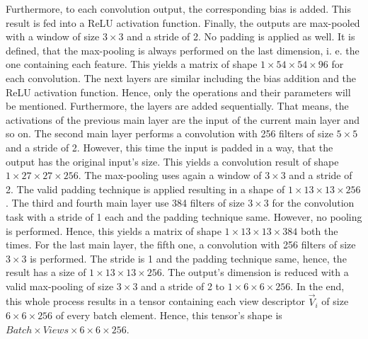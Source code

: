 Furthermore, to each convolution output, the corresponding bias is added.
This result is fed into a ReLU activation function.
Finally, the outputs are max-pooled with a window of size $3 \times 3$ and a stride of 2.
No padding is applied as well.
It is defined, that the max-pooling is always performed on the last dimension, i. e. the one containing each feature.
This yields a matrix of shape $1 \times 54 \times 54 \times 96$ for each convolution.
The next layers are similar including the bias addition and the ReLU activation function.
Hence, only the operations and their parameters will be mentioned.
Furthermore, the layers are added sequentially.
That means, the activations of the previous main layer are the input of the current main layer and so on.
The second main layer performs a convolution with 256 filters of size $5 \times 5$ and a stride of 2.
However, this time the input is padded in a way, that the output has the original input's size.
This yields a convolution result of shape $1 \times 27 \times 27 \times 256$.
The max-pooling uses again a window of $3 \times 3$ and a stride of 2.
The valid padding technique is applied resulting in a shape of $1 \times 13 \times 13 \times 256$.
The third and fourth main layer use 384 filters of size $3 \times 3$ for the convolution task with a stride of 1 each and the padding technique same.
However, no pooling is performed.
Hence, this yields a matrix of shape $1 \times 13 \times 13 \times 384$ both the times.
For the last main layer, the fifth one, a convolution with 256 filters of size $3 \times 3$ is performed.
The stride is 1 and the padding technique same, hence, the result has a size of $1 \times 13 \times 13 \times 256$.
The output's dimension is reduced with a valid max-pooling of size $3 \times 3$ and a stride of 2 to $1 \times 6 \times 6 \times 256$.
In the end, this whole process results in a tensor containing each view descriptor $\vec{V}_i$ of size $6 \times 6 \times 256$ of every batch element.
Hence, this tensor's shape is $Batch \times Views \times 6 \times 6 \times 256$.